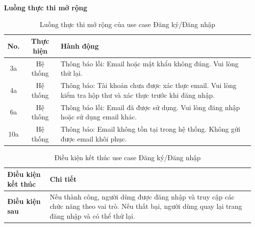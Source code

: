 ﻿\documentclass[../DoAn.tex]{subfiles}
\begin{document}
\noindent\textbf{Luồng thực thi mở rộng}
\begin{table}[H]
\centering
\begin{tabular}{|c|c|p{9cm}|}
\hline
\textbf{No.} & \textbf{Thực hiện} & \textbf{Hành động} \\ \hline
3a & Hệ thống & Thông báo lỗi: Email hoặc mật khẩu không đúng. Vui lòng thử lại. \\ \hline
4a & Hệ thống & Thông báo: Tài khoản chưa được xác thực email. Vui lòng kiểm tra hộp thư và xác thực trước khi đăng nhập. \\ \hline
6a & Hệ thống & Thông báo lỗi: Email đã được sử dụng. Vui lòng đăng nhập hoặc sử dụng email khác. \\ \hline
10a & Hệ thống & Thông báo: Email không tồn tại trong hệ thống. Không gửi được email khôi phục. \\ \hline
\end{tabular}
\caption{Luồng thực thi mở rộng của use case Đăng ký/Đăng nhập}
\label{table:appendix:B.5_ext}
\end{table}
\begin{table}[H]
\centering
\begin{tabular}{|p{4cm}|p{10cm}|}
\hline
\textbf{Điều kiện kết thúc} & \textbf{Chi tiết} \\ \hline
\textbf{Điều kiện sau} & Nếu thành công, người dùng được đăng nhập và truy cập các chức năng theo vai trò. Nếu thất bại, người dùng quay lại trang đăng nhập và có thể thử lại. \\ \hline
\end{tabular}
\caption{Điều kiện kết thúc use case Đăng ký/Đăng nhập}
\label{table:appendix:B.5_post}
\end{table}
\end{document}
